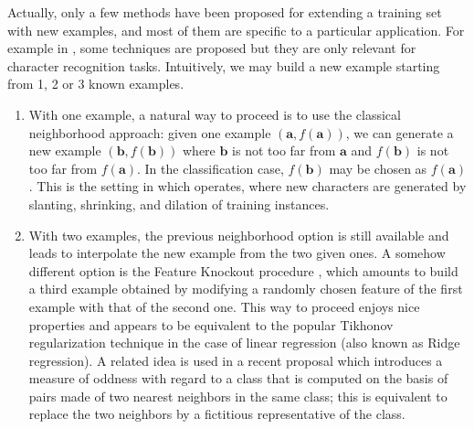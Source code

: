Actually, only a few methods have been proposed for extending a training set with
new examples, and most of them are specific to a particular application. For
example in \cite{CanPerArlLlo06}, some techniques are proposed but they are
only relevant for character recognition tasks. Intuitively, we may build a new
example starting from 1, 2 or 3 known examples.
\begin{enumerate}
\item With one example, a natural way to proceed is to use the classical
  neighborhood approach: given one  example $(\mathbf{a},f(\mathbf{a}))$, we
    can generate a new example $(\mathbf{b},f(\mathbf{b}))$ where  $\mathbf{b}$
    is not too far from $\mathbf{a}$ and $f(\mathbf{b})$ is not too far from
    $f(\mathbf{a})$. In the classification case, $f(\mathbf{b})$ may be chosen
    as $f(\mathbf{a})$. This is the setting in which \cite{CanPerArlLlo06}
    operates, where new characters are generated by slanting, shrinking, and
    dilation of training instances.
\item With two examples, the previous neighborhood option is still available
  and leads to interpolate the new example from the two given ones.  A somehow
    different option is the Feature Knockout procedure \cite{WolMar04}, which
    amounts to build a third example obtained by modifying a randomly chosen
    feature of the first example with that of the second one.  This way to
    proceed enjoys nice properties and appears to be equivalent to the popular
    Tikhonov regularization  technique in the case of linear regression (also
    known  as Ridge regression).  A
    related idea is used in a recent proposal \cite{BouPraRicECAI16} which
    introduces a measure of oddness with regard to a class that is computed on the
    basis of pairs made of two nearest neighbors in the same class; this is
    equivalent to replace the two neighbors by a fictitious representative of
    the class.


\end{enumerate}

